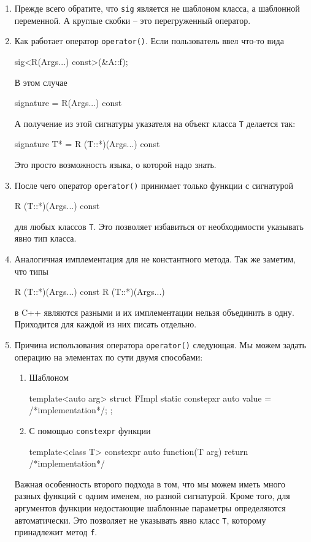 \begin{enumerate}
\item Прежде всего обратите, что \verb"sig" является не шаблоном класса, а шаблонной переменной.
А круглые скобки -- это перегруженный оператор.

\item Как работает оператор \verb"operator()".
Если пользователь ввел что-то вида
\begin{cppcode}[numbers = none]
sig<R(Args...) const>(&A::f);
\end{cppcode}
В этом случае
\begin{cppcode}[numbers = none]
signature = R(Args...) const
\end{cppcode}
А получение из этой сигнатуры указателя на объект класса \verb"T" делается так:
\begin{cppcode}[numbers = none]
signature T* = R (T::*)(Args...) const
\end{cppcode}
Это просто возможность языка, о которой надо знать.

\item После чего оператор \verb"operator()" принимает только функции с сигнатурой
\begin{cppcode}[numbers = none]
R (T::*)(Args...) const
\end{cppcode}
для любых классов \verb"T".
Это позволяет избавиться от необходимости указывать явно тип класса.

\item Аналогичная имплементация для не константного метода.
Так же заметим, что типы
\begin{cppcode}[numbers = none]
R (T::*)(Args...) const
R (T::*)(Args...)
\end{cppcode}
в C++ являются разными и их имплементации нельзя объединить в одну.
Приходится для каждой из них писать отдельно.

\item Причина использования оператора \verb"operator()" следующая.
Мы можем задать операцию на элементах по сути двумя способами:
\begin{enumerate}
\item Шаблоном
\begin{cppcode}[numbers = none]
template<auto arg>
struct FImpl {
  static constepxr auto value = /*implementation*/;
};
\end{cppcode}

\item С помощью \verb"constexpr" функции
\begin{cppcode}[numbers = none]
template<class T>
constexpr auto function(T arg) { 
  return /*implementation*/ 
}
\end{cppcode}
\end{enumerate}
Важная особенность второго подхода в том, что мы можем иметь много разных функций с одним именем, но разной сигнатурой.
Кроме того, для аргументов функции недостающие шаблонные параметры определяются автоматически.
Это позволяет не указывать явно класс \verb"T", которому принадлежит метод \verb"f".
\end{enumerate}

